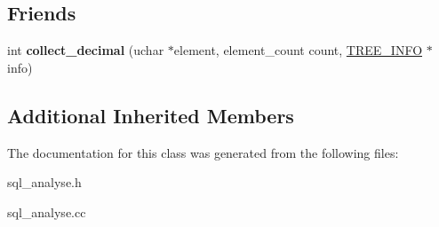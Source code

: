\subsection*{Friends}
\begin{DoxyCompactItemize}
\item 
\mbox{\label{classfield__decimal_acc6458700b6e411f3d00d58ce6677ff7}} 
int {\bfseries collect\+\_\+decimal} (uchar $\ast$element, element\+\_\+count count, \mbox{\hyperlink{structst__tree__info}{T\+R\+E\+E\+\_\+\+I\+N\+FO}} $\ast$info)
\end{DoxyCompactItemize}
\subsection*{Additional Inherited Members}


The documentation for this class was generated from the following files\+:\begin{DoxyCompactItemize}
\item 
sql\+\_\+analyse.\+h\item 
sql\+\_\+analyse.\+cc\end{DoxyCompactItemize}
